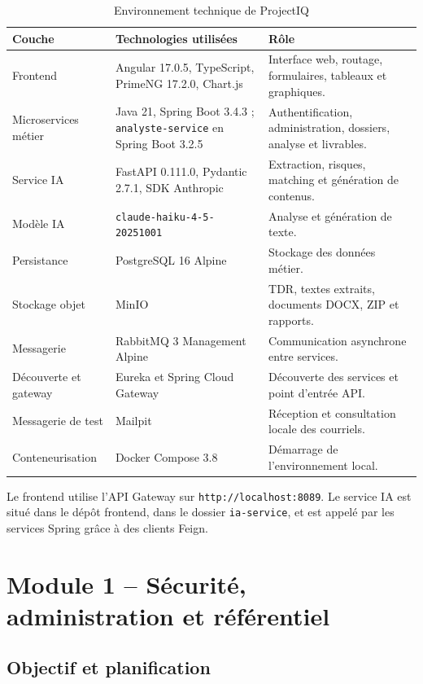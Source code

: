 \begin{table}[H]
\centering
\small
\caption{Environnement technique de ProjectIQ}
\label{tab:environnement-technique}
\begin{tabularx}{\textwidth}{p{3cm}Y Y}
\toprule
\textbf{Couche} & \textbf{Technologies utilisées} & \textbf{Rôle} \\
\midrule
Frontend & Angular 17.0.5, TypeScript, PrimeNG 17.2.0, Chart.js & Interface web, routage, formulaires, tableaux et graphiques. \\
Microservices métier & Java 21, Spring Boot 3.4.3 ; \texttt{analyste-service} en Spring Boot 3.2.5 & Authentification, administration, dossiers, analyse et livrables. \\
Service IA & FastAPI 0.111.0, Pydantic 2.7.1, SDK Anthropic & Extraction, risques, matching et génération de contenus. \\
Modèle IA & \texttt{claude-haiku-4-5-20251001} & Analyse et génération de texte. \\
Persistance & PostgreSQL 16 Alpine & Stockage des données métier. \\
Stockage objet & MinIO & TDR, textes extraits, documents DOCX, ZIP et rapports. \\
Messagerie & RabbitMQ 3 Management Alpine & Communication asynchrone entre services. \\
Découverte et gateway & Eureka et Spring Cloud Gateway & Découverte des services et point d’entrée API. \\
Messagerie de test & Mailpit & Réception et consultation locale des courriels. \\
Conteneurisation & Docker Compose 3.8 & Démarrage de l’environnement local. \\
\bottomrule
\end{tabularx}
\end{table}

Le frontend utilise l’API Gateway sur \texttt{http://localhost:8089}. Le service IA est situé dans le dépôt frontend, dans le dossier \texttt{ia-service}, et est appelé par les services Spring grâce à des clients Feign.

\section{Module 1 -- Sécurité, administration et référentiel}

\subsection{Objectif et planification}

